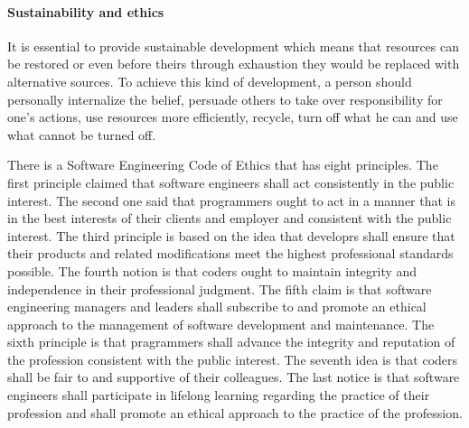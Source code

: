 \documentclass[12pt,twoside,english,a4paper]{article}
\begin{document}
\paragraph{Sustainability and ethics}
It is essential to provide sustainable development which means that resources can be restored or even before theirs through exhaustion they would be replaced with alternative sources. To achieve this kind of development, a person should personally internalize the belief, persuade others to take over responsibility for one's actions, use resources more efficiently, recycle, turn off what he can and use what cannot be turned off.

There is a Software Engineering Code of Ethics that has eight principles. The first principle claimed that software engineers shall act consistently in the public interest. The second one said that programmers ought to act in a manner that is in the best interests of their clients and employer and consistent with the public interest. The third principle is based on the idea that developrs shall ensure that their products and related modifications meet the highest professional standards possible. The fourth notion is that coders ought to maintain integrity and independence in their professional judgment. The fifth claim is that software engineering managers and leaders shall subscribe to and promote an ethical approach to the management of software development and maintenance. The sixth principle is that pragrammers shall advance the integrity and reputation of the profession consistent with the public interest. The seventh idea is that coders shall be fair to and supportive of their colleagues. The last notice is that software engineers shall participate in lifelong learning
regarding the practice of their profession and shall promote an ethical approach to the practice of the profession.


\end{document}
